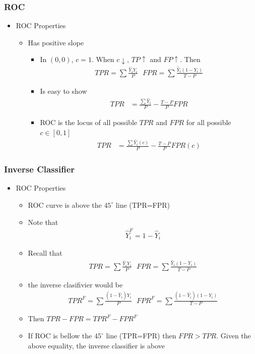 \documentclass[
  shownotes,
  xcolor={svgnames},
  hyperref={colorlinks,citecolor=DarkBlue,linkcolor=DarkRed,urlcolor=DarkBlue}
  , aspectratio=169]{beamer}
\begin{document}
\begin{frame}[fragile]
\frametitle{ROC}
\begin{itemize}
  \item ROC Properties 

  \begin{itemize}
  \item Has positive slope
  \begin{itemize}
    \item In $(0,0)$, $c=1$. When $c\downarrow$, $TP \uparrow$ and $FP\uparrow$. Then
    \begin{align}
    TPR = \sum \frac{\hat{Y}_iY_i}{P} \,\,\,\, FPR = \sum \frac{\hat{Y}_i(1-Y_i)}{T-P}
    \end{align}
    \item Is easy to show
    \begin{align}
    TPR &= \frac{\sum \hat{Y}_i}{P} - \frac{T-P}{P}FPR
    \end{align}
    \item ROC is the locus of all possible $TPR$ and $FPR$ for all possible $c\in[0,1]$ 
    \begin{align}
    TPR &= \frac{\sum \hat{Y}_i(c)}{P} - \frac{T-P}{P}FPR(c)
    \end{align}
  \end{itemize}
\end{itemize}  
\end{itemize}


\end{frame}
\begin{frame}[fragile]
\frametitle{Inverse Classifier}
  \begin{itemize}
  \item ROC Properties 
  \begin{itemize}
    \item ROC curve is above the $45^{\circ}$ line (TPR=FPR)
    \item Note that
    \begin{align}
    \hat{Y}_i^F = 1- \hat{Y}_i 
    \end{align}
    \item Recall that
    \begin{align}
    TPR = \sum \frac{\hat{Y}_iY_i}{P} \,\,\,\, FPR = \sum \frac{\hat{Y}_i(1-Y_i)}{T-P}
    \end{align}
    \item the inverse clasifivier would be
    \begin{align}
    TPR^F = \sum \frac{(1-\hat{Y}_i)Y_i}{P} \,\,\,\, FPR^F = \sum \frac{(1-\hat{Y}_i)(1-Y_i)}{T-P}
    \end{align}
    \item Then $TPR - FPR= TPR^F - FPR^F$
    \item If ROC is bellow the $45^{\circ}$ line (TPR=FPR) then $FPR>TPR$. Given the above equality, the inverse classifier is above 
  \end{itemize}

\end{itemize}

\end{frame}
\end{document}

